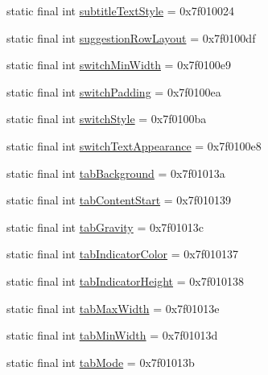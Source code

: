 \begin{CompactItemize}
\item 
static final int \hyperlink{classandroid_1_1support_1_1v7_1_1palette_1_1_r_1_1attr_d9445f34a7e928161b8c5b0fda448829}{subtitleTextStyle} = 0x7f010024
\item 
static final int \hyperlink{classandroid_1_1support_1_1v7_1_1palette_1_1_r_1_1attr_8d4295d373b13864b9103a0651ee775a}{suggestionRowLayout} = 0x7f0100df
\item 
static final int \hyperlink{classandroid_1_1support_1_1v7_1_1palette_1_1_r_1_1attr_9c425794fef208a1e56f12431842c3e3}{switchMinWidth} = 0x7f0100e9
\item 
static final int \hyperlink{classandroid_1_1support_1_1v7_1_1palette_1_1_r_1_1attr_f6f899fe9ae8c69fa9778e8b082ef46d}{switchPadding} = 0x7f0100ea
\item 
static final int \hyperlink{classandroid_1_1support_1_1v7_1_1palette_1_1_r_1_1attr_dec306b410d3ba4124ff77b3e5f9380a}{switchStyle} = 0x7f0100ba
\item 
static final int \hyperlink{classandroid_1_1support_1_1v7_1_1palette_1_1_r_1_1attr_b26cdef79860bfbc15dc48c62fd68351}{switchTextAppearance} = 0x7f0100e8
\item 
static final int \hyperlink{classandroid_1_1support_1_1v7_1_1palette_1_1_r_1_1attr_465ae499fb5d0d45d10cfaa029d8b3b2}{tabBackground} = 0x7f01013a
\item 
static final int \hyperlink{classandroid_1_1support_1_1v7_1_1palette_1_1_r_1_1attr_36db05c772b564d06994a96344ceccae}{tabContentStart} = 0x7f010139
\item 
static final int \hyperlink{classandroid_1_1support_1_1v7_1_1palette_1_1_r_1_1attr_df46a500fa7df93ee0716492bc94c261}{tabGravity} = 0x7f01013c
\item 
static final int \hyperlink{classandroid_1_1support_1_1v7_1_1palette_1_1_r_1_1attr_a686289b1972f5e26bb308f0cac441d0}{tabIndicatorColor} = 0x7f010137
\item 
static final int \hyperlink{classandroid_1_1support_1_1v7_1_1palette_1_1_r_1_1attr_0bee08ee77f36da25775c9066cd26c2f}{tabIndicatorHeight} = 0x7f010138
\item 
static final int \hyperlink{classandroid_1_1support_1_1v7_1_1palette_1_1_r_1_1attr_2acb16ed7ec7e88f8add595cef8414ea}{tabMaxWidth} = 0x7f01013e
\item 
static final int \hyperlink{classandroid_1_1support_1_1v7_1_1palette_1_1_r_1_1attr_d511e5b0f4d01428d15b9b1501c4aea2}{tabMinWidth} = 0x7f01013d
\item 
static final int \hyperlink{classandroid_1_1support_1_1v7_1_1palette_1_1_r_1_1attr_34cca503f9ec9a37ccede7e957dcfb3c}{tabMode} = 0x7f01013b

\end{CompactItemize}
